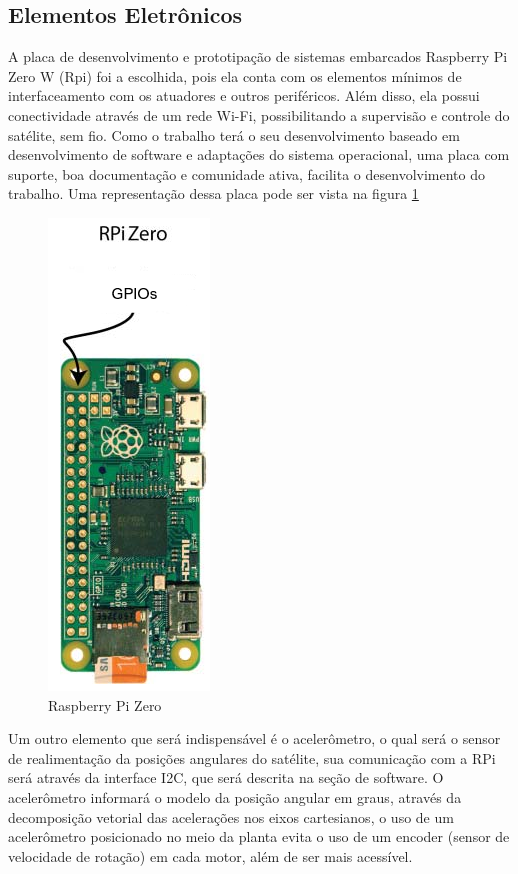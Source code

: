 
\subsection{Elementos Eletrônicos}

A placa de desenvolvimento e prototipação de sistemas embarcados Raspberry Pi Zero W (Rpi) foi a escolhida, pois ela conta com os elementos mínimos de interfaceamento com os atuadores e outros periféricos. Além disso, ela possui conectividade através de um rede Wi-Fi, possibilitando a supervisão e controle do satélite, sem fio. Como o trabalho terá o seu desenvolvimento baseado em desenvolvimento de software e adaptações do sistema operacional, uma placa com suporte, boa documentação e comunidade ativa, facilita o desenvolvimento do trabalho. Uma representação dessa placa pode ser vista na figura \ref{fig:rasp_zero}

\begin{figure}[H]
  \caption{Raspberry Pi Zero}
  \begin{center}
      \includegraphics[scale=.55]{img/rasp_zero}
  \end{center}
  \label{fig:rasp_zero}
\end{figure}

Um outro elemento que será indispensável é o acelerômetro, o qual será o sensor de realimentação da posições angulares do satélite, sua comunicação com a RPi será através da interface I2C, que será descrita na seção de software. O acelerômetro informará o modelo da posição angular em graus, através da decomposição vetorial das acelerações nos eixos cartesianos, o uso de um acelerômetro posicionado no meio da planta evita o uso de um encoder (sensor de velocidade de rotação) em cada motor, além de ser mais acessível.

